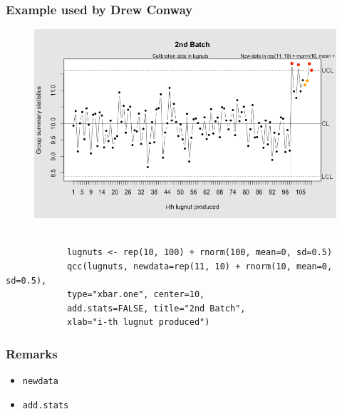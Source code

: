 \documentclass[]{report}
\begin{document}
		\subsubsection{Example used by Drew Conway}
		\begin{figure}[h!]
			\centering
			\includegraphics[width=0.7\linewidth]{./qcc_holdout2}
			\caption{}
			\label{fig:qcc_holdout2}
		\end{figure}
		\begin{framed}
			\begin{verbatim} 
			
			lugnuts <- rep(10, 100) + rnorm(100, mean=0, sd=0.5)
			qcc(lugnuts, newdata=rep(11, 10) + rnorm(10, mean=0, sd=0.5),
			type="xbar.one", center=10, 
			add.stats=FALSE, title="2nd Batch", 
			xlab="i-th lugnut produced")
			\end{verbatim}
		\end{framed}
		
		\subsubsection{Remarks}
		{\large
			\begin{itemize}
				\item \texttt{newdata}
				\item \texttt{add.stats }
			\end{itemize}}
			
			
			
			
			
\end{document}
